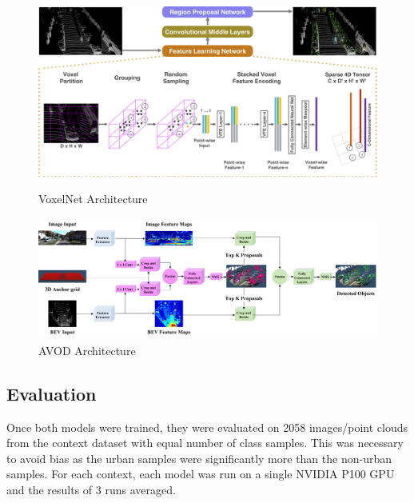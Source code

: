 \begin{figure}[H]
	\centering
	\begin{minipage}[b]{0.45\textwidth}
		\includegraphics[width=\textwidth]{images/vox_arch.png}
		\caption{VoxelNet Architecture}
		\label{fig:voxarch}
	\end{minipage}
	\hfill
	\begin{minipage}[b]{0.45\textwidth}
		\includegraphics[width=\textwidth,height=4cm]{images/avodarch.png}
		\caption{AVOD Architecture}
		\label{fig:avodarch}
	\end{minipage}
\end{figure}


\subsection{Evaluation}

Once both models were trained, they were evaluated on 2058 images/point clouds from the context dataset with equal number of class samples. This was necessary to avoid bias as the urban samples were significantly more than the non-urban samples. For each context, each model was run on a single NVIDIA P100 GPU and the results of 3 runs  averaged. 

